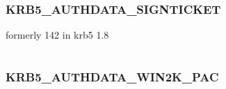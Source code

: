 \documentclass[letterpaper,10pt,english]{sphinxmanual}
\begin{document}
\begin{fulllineitems}
\label{appdev/refs/macros/KRB5_AUTHDATA_SESAME:KRB5_AUTHDATA_SESAME}
\end{fulllineitems}


\begin{tabulary}{\linewidth}{|L|L|}
\hline

 & 
\\
\hline\end{tabulary}



\subsubsection{KRB5\_AUTHDATA\_SIGNTICKET}
\label{appdev/refs/macros/KRB5_AUTHDATA_SIGNTICKET:krb5-authdata-signticket-data}\label{appdev/refs/macros/KRB5_AUTHDATA_SIGNTICKET:krb5-authdata-signticket}\label{appdev/refs/macros/KRB5_AUTHDATA_SIGNTICKET::doc}

\begin{fulllineitems}
\label{appdev/refs/macros/KRB5_AUTHDATA_SIGNTICKET:KRB5_AUTHDATA_SIGNTICKET}
\end{fulllineitems}


formerly 142 in krb5 1.8

\begin{tabulary}{\linewidth}{|L|L|}
\hline

 & 
\\
\hline\end{tabulary}



\subsubsection{KRB5\_AUTHDATA\_WIN2K\_PAC}
\label{appdev/refs/macros/KRB5_AUTHDATA_WIN2K_PAC:krb5-authdata-win2k-pac-data}\label{appdev/refs/macros/KRB5_AUTHDATA_WIN2K_PAC::doc}\label{appdev/refs/macros/KRB5_AUTHDATA_WIN2K_PAC:krb5-authdata-win2k-pac}

\begin{fulllineitems}
\label{appdev/refs/macros/KRB5_AUTHDATA_WIN2K_PAC:KRB5_AUTHDATA_WIN2K_PAC}
\end{fulllineitems}
\end{document}
